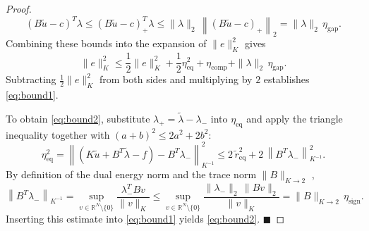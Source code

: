\documentclass[11pt,a4paper]{article}
\begin{document}
\begin{proof}
\[
(B \tilde{u} - c)^T \lambda \le (B \tilde{u} - c)_+^T \lambda \le \|\lambda\|_2 \, \left\| (B \tilde{u} - c)_+ \right\|_2 = \|\lambda\|_2 \, \eta_{\mathrm{gap}}.
\]
Combining these bounds into the expansion of \(\|e\|_K^2\) gives
\[
\|e\|_K^2 \le \frac{1}{2} \|e\|_K^2 + \frac{1}{2} \eta_{\mathrm{eq}}^2 + \eta_{\mathrm{comp}} + \|\lambda\|_2 \, \eta_{\mathrm{gap}}.
\]
Subtracting \(\frac{1}{2} \|e\|_K^2\) from both sides and multiplying by \(2\) establishes \eqref{eq:bound1}.

To obtain \eqref{eq:bound2}, substitute \(\lambda_+ = \tilde{\lambda} - \lambda_-\) into \(\eta_{\mathrm{eq}}\) and apply the triangle inequality together with \((a + b)^2 \le 2 a^2 + 2 b^2\):
\[
\eta_{\mathrm{eq}}^2 = \left\| \left( K \tilde{u} + B^T \tilde{\lambda} - f \right) - B^T \lambda_- \right\|_{K^{-1}}^2 \le 2\,\tilde{r}_{\mathrm{eq}}^2 + 2\,\left\| B^T \lambda_- \right\|_{K^{-1}}^2.
\]
By definition of the dual energy norm and the trace norm \(\|B\|_{K \to 2}\) \cite{coorevits2000posteriori, franceschini2022block},
\[
\left\| B^T \lambda_- \right\|_{K^{-1}} = \sup_{v \in \mathbb{R}^N \setminus \{0\}} \frac{\lambda_-^T B v}{\|v\|_K} \le \sup_{v \in \mathbb{R}^N \setminus \{0\}} \frac{\|\lambda_-\|_2 \, \|B v\|_2}{\|v\|_K} = \|B\|_{K \to 2} \, \eta_{\mathrm{sign}}.
\]
Inserting this estimate into \eqref{eq:bound1} yields \eqref{eq:bound2}. \(\blacksquare\)

\end{proof}
\end{document}
